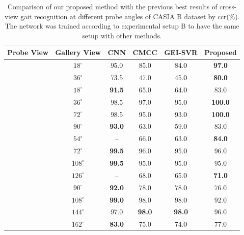 \begin{table}
	\centering
	\caption{Comparison of our proposed method with the previous best results of cross-view gait recognition at different probe angles of CASIA B dataset by \gls{ccr}(\%). The network was trained according to experimental setup B to have the same setup with other methods. \label{table:comp_casia_b_cross_view}}
	
	{\begin{tabular*}{29pc}{c|c|cccc}\hline  \rule{0pt}{2ex}
	Probe View &Gallery View &CNN &CMCC &GEI-SVR  &\textbf{Proposed} \\ \hline\rule{0pt}{3ex}
	
	\multirow{2}{*}{$0^{\circ}$} &$18^{\circ}$ &95.0 &85.0 &84.0 &\textbf{97.0} \\\rule{0pt}{2ex}
	
					&$36^{\circ}$ &73.5 &47.0 &45.0 &\textbf{80.0} \\ \hline\rule{0pt}{3ex}
	
	
	\multirow{4}{*}{$54^{\circ}$} &$18^{\circ}$ &\textbf{91.5} &65.0 &64.0  &83.0 \\\rule{0pt}{2ex}
	
			&$36^{\circ}$ &98.5 &97.0 &95.0 &\textbf{100.0} \\\rule{0pt}{2ex}
	
			&$72^{\circ}$ &98.5 &95.0 &93.0 &\textbf{100.0} \\\rule{0pt}{2ex}
	
			&$90^{\circ}$ &\textbf{93.0} &63.0 &59.0 &83.0 \\\hline\rule{0pt}{3ex}
	
	
	\multirow{4}{*}{$90^{\circ}$} &$54^{\circ}$ &-- &66.0 &63.0 &\textbf{84.0 }\\\rule{0pt}{2ex}
	
		&$72^{\circ}$ &\textbf{99.5} &96.0 &95.0 &96.0 \\ \rule{0pt}{2ex}
	
		&$108^{\circ}$ &\textbf{99.5} &95.0 &95.0 &95.0 \\ \rule{0pt}{2ex}
	
		&$126^{\circ}$ &-- &68.0 &65.0 &\textbf{71.0} \\\hline\rule{0pt}{3ex}
	
	
	\multirow{4}{*}{$126^{\circ}$} &$90^{\circ}$ &\textbf{92.0} &78.0 &78.0 &76.0 \\\rule{0pt}{2ex}
			&$108^{\circ}$ &\textbf{99.0} &98.0 &98.0 &92.0 \\\rule{0pt}{2ex}
			&$144^{\circ}$ &97.0 &\textbf{98.0} &\textbf{98.0} &96.0 \\\rule{0pt}{2ex}
			&$162^{\circ}$ &\textbf{83.0} &75.0 &74.0 &77.0 \\\hline
	\end{tabular*}}{} 
\end{table}

